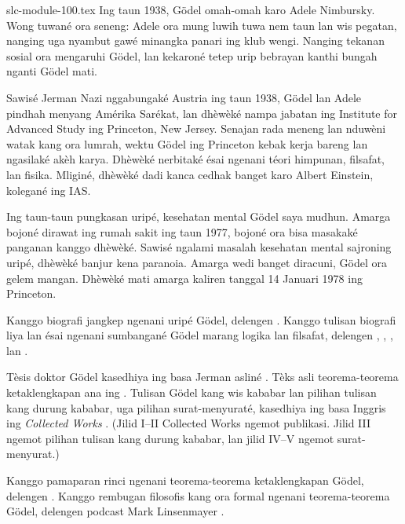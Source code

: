 \begin{filecontents*}[overwrite]{slc-module-100.tex}
Ing taun 1938, G\"odel omah-omah karo Adele
Nimbursky. Wong tuwané ora seneng:
Adele ora mung luwih tuwa nem taun lan
wis pegatan, nanging uga nyambut gawé
minangka panari ing klub wengi.
Nanging tekanan sosial ora mengaruhi
G{\"o}del, lan kekaroné tetep urip
bebrayan kanthi bungah nganti Gödel mati.

Sawisé Jerman Nazi nggabungaké Austria
ing taun 1938, G{\"o}del lan Adele
pindhah menyang Amérika Sarékat, lan
dhèwèké nampa jabatan ing Institute
for Advanced Study ing Princeton,
New Jersey. Senajan rada meneng lan nduwèni
watak kang ora lumrah, wektu G{\"o}del
ing Princeton kebak kerja bareng lan
ngasilaké akèh karya. Dhèwèké
nerbitaké ésai ngenani téori himpunan,
filsafat, lan fisika. Mliginé,
dhèwèké dadi kanca cedhak banget
karo Albert Einstein, kolegané ing IAS.

Ing taun-taun pungkasan uripé,
kesehatan mental G{\"o}del saya
mudhun. Amarga bojoné dirawat
ing rumah sakit ing taun 1977,
bojoné ora bisa masakaké panganan
kanggo dhèwèké. Sawisé ngalami
masalah kesehatan mental sajroning
uripé, dhèwèké banjur kena
paranoia. Amarga wedi banget
diracuni, G{\"o}del ora gelem
mangan. Dhèwèké mati amarga
kaliren tanggal 14 Januari 1978
ing Princeton.

\begin{reading}
Kanggo biografi jangkep ngenani
uripé G{\"o}del, delengen
\citet{Dawson1997}. Kanggo tulisan
biografi liya lan ésai ngenani
sumbangané G{\"o}del marang
logika lan filsafat, delengen
\citet{Wang1990}, \citet{Baaz2011},
\citet{Takeuti2003}, lan
\citet{Sigmund2007}.

Tèsis doktor G{\"o}del kasedhiya
ing basa Jerman asliné
\citep{Godel1929}. Tèks asli
teorema-teorema ketaklengkapan
ana ing \citep{Godel1931}.
Tulisan G\"odel kang wis kababar
lan pilihan tulisan kang durung kababar,
uga pilihan surat-menyuraté,
kasedhiya ing basa Inggris
ing \emph{Collected Works}
\citet{Godel1986,Godel1990}.
(Jilid I--II Collected Works ngemot publikasi. Jilid III ngemot pilihan tulisan kang durung kababar, lan jilid IV--V ngemot surat-menyurat.)

Kanggo pamaparan rinci ngenani
teorema-teorema ketaklengkapan
G{\"o}del, delengen
\citet{Smith2013}. Kanggo
rembugan filosofis kang ora
formal ngenani teorema-teorema
G{\"o}del, delengen podcast
Mark Linsenmayer
\citep{Linsenmayer2014}.
\end{reading}


\end{filecontents*}

